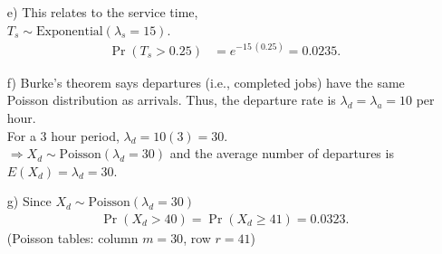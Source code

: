 \documentclass[12pt]{article}
\begin{document}
{\begin{minipage}[t]{0.98\textwidth}
\begin{minipage}[t]{0.47\textwidth}
\begin{enumerate}
{\footnotesize(note: 15 minutes $= \frac{15}{60} = 0.25$ hours)}
\begin{align*}
\Pr(T > 0.25) &= e^{-5\,(0.25)} = 0.2865.
\end{align*}
\item[e)] This relates to the service time, \\$T_s \sim \text{Exponential}(\lambda_s=15)$.
\begin{align*}
\Pr(T_s > 0.25) &= e^{-15\,(0.25)} = 0.0235.
\end{align*}
\item[f)] Burke's theorem says departures (i.e., completed jobs) have the same Poisson distribution as arrivals. Thus, the departure rate is $\lambda_d = \lambda_a = 10$ per hour.\\[0.3cm]
    For a 3 hour period, $\lambda_d = 10(3) = 30$.\\[0.3cm]
    $\Rightarrow X_d \sim \text{Poisson}(\lambda_d=30)$ and the average number of departures is $E(X_d) = \lambda_d = 30$.
\item[g)] Since $X_d \sim \text{Poisson}(\lambda_d=30)$
\begin{align*}
\Pr(X_d > 40) = \Pr(X_d \ge 41) = 0.0323.
\end{align*}
(Poisson tables: column $m = 30$, row $r=41$)
\end{enumerate}
\end{minipage}
\end{minipage}}\vspace{0.03\textwidth}
\end{document}
